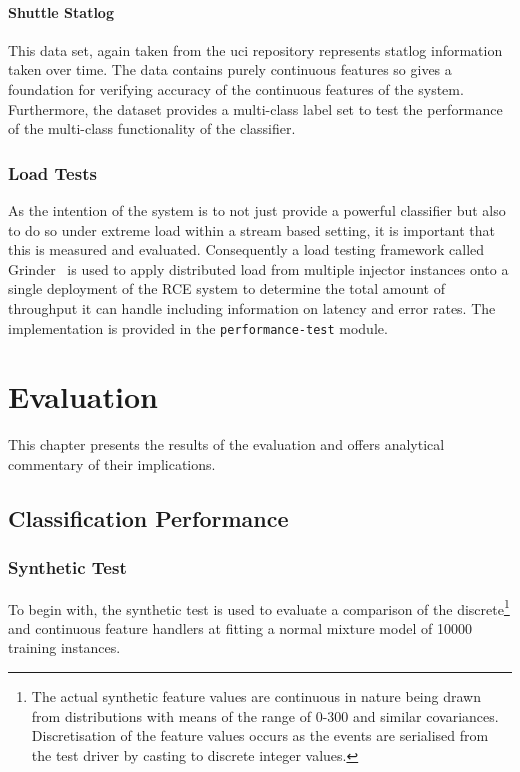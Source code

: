 \documentclass[a4paper,11pt]{scrreprt}
\begin{document}
\subsubsection{Shuttle Statlog}
This data set, again taken from the \acrshort{uci} repository represents statlog information taken over time. The data contains purely continuous features so gives a foundation for verifying accuracy of the continuous features of the system. Furthermore, the dataset provides a multi-class label set to test the performance of the multi-class functionality of the classifier. 

\subsection{Load Tests}
As the intention of the system is to not just provide a powerful classifier but also to do so under extreme load within a stream based setting, it is important that this is measured and evaluated. Consequently a load testing framework called Grinder~\cite{grinder} is used to apply distributed load from multiple injector instances onto a single deployment of the RCE system to determine the total amount of throughput it can handle including information on latency and error rates. The implementation is provided in the \verb|performance-test| module.

\chapter{Evaluation}
This chapter presents the results of the evaluation and offers analytical commentary of their implications.
\section{Classification Performance}
\subsection{Synthetic Test}
To begin with, the synthetic test is used to evaluate a comparison of the discrete\footnote{The actual synthetic feature values are continuous in nature being drawn from distributions with means of the range of 0-300 and similar covariances. Discretisation of the feature values occurs as the events are serialised from the test driver by casting to discrete integer values.} and continuous feature handlers at fitting a normal mixture model of 10000 training instances.
\end{document}
